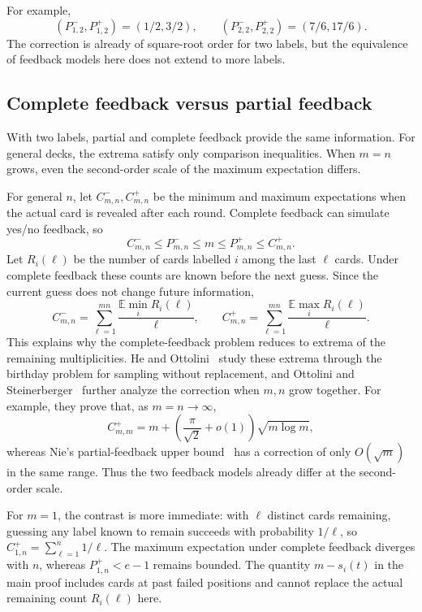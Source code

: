 \documentclass[11pt,reqno]{amsart}
\numberwithin{equation}{section}
\theoremstyle{remark}
\theoremstyle{definition}
\newcommand{\E}{\mathbb E}
\begin{document}
For example,
\[
 (P^-_{1,2},P^+_{1,2})=(1/2,3/2),\qquad
 (P^-_{2,2},P^+_{2,2})=(7/6,17/6).
\]
The correction is already of square-root order for two labels, but the equivalence of feedback models here does not extend to more labels.

\subsection{Complete feedback versus partial feedback}
With two labels, partial and complete feedback provide the same information. For general decks, the extrema satisfy only comparison inequalities. When $m=n$ grows, even the second-order scale of the maximum expectation differs.

For general $n$, let $C^-_{m,n},C^+_{m,n}$ be the minimum and maximum expectations when the actual card is revealed after each round. Complete feedback can simulate yes/no feedback, so
\[
 C^-_{m,n}\le P^-_{m,n}\le m\le P^+_{m,n}\le C^+_{m,n}.
\]
Let $R_i(\ell)$ be the number of cards labelled $i$ among the last $\ell$ cards. Under complete feedback these counts are known before the next guess. Since the current guess does not change future information,
\[
 C^-_{m,n}=\sum_{\ell=1}^{mn}\frac{\E\min_iR_i(\ell)}{\ell},\qquad
 C^+_{m,n}=\sum_{\ell=1}^{mn}\frac{\E\max_iR_i(\ell)}{\ell}.
\]
This explains why the complete-feedback problem reduces to extrema of the remaining multiplicities. He and Ottolini~\cite{HO} study these extrema through the birthday problem for sampling without replacement, and Ottolini and Steinerberger~\cite[Main Theorem]{OS} further analyze the correction when $m,n$ grow together. For example, they prove that, as $m=n\to\infty$,
\[
 C^+_{m,m}=m+\left(\frac\pi{\sqrt2}+o(1)\right)\sqrt{m\log m},
\]
whereas Nie's partial-feedback upper bound~\cite[Theorem~1.3]{Nie} has a correction of only $O(\sqrt m)$ in the same range. Thus the two feedback models already differ at the second-order scale.

For $m=1$, the contrast is more immediate: with $\ell$ distinct cards remaining, guessing any label known to remain succeeds with probability $1/\ell$, so $C^+_{1,n}=\sum_{\ell=1}^n1/\ell$. The maximum expectation under complete feedback diverges with $n$, whereas $P^+_{1,n}<e-1$ remains bounded. The quantity $m-s_i(t)$ in the main proof includes cards at past failed positions and cannot replace the actual remaining count $R_i(\ell)$ here.

\clearpage


\end{document}
